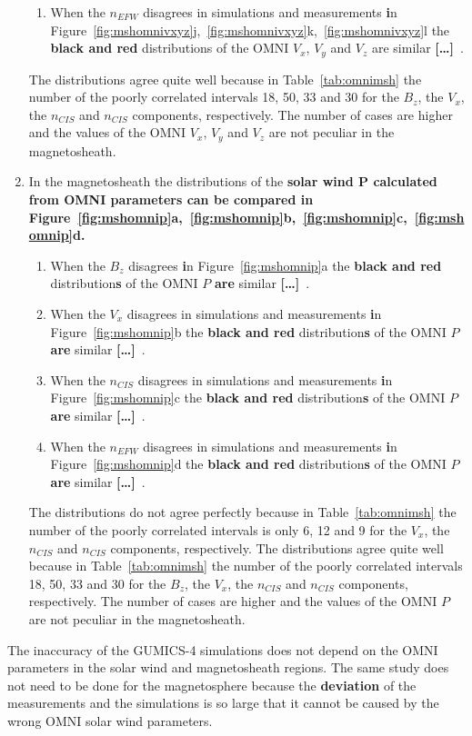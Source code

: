 \documentclass[linenumbers,draft]{agujournal}
\newcommand{\del}{\textbf{[\dots]}\ } %
\begin{document}
\begin{enumerate}
\begin{enumerate}
\item When the $n_{EFW}$ disagrees in simulations and measurements \textbf{i}n Figure~\ref{fig:mshomnivxyz}j,~\ref{fig:mshomnivxyz}k,~\ref{fig:mshomnivxyz}l the \textbf{black and red} distributions of the OMNI $V_{x}$, $V_{y}$ and $V_{z}$ are similar \del.
\end{enumerate}
The distributions agree quite well because in Table~\ref{tab:omnimsh} the number of the poorly correlated intervals 18, 50, 33 and 30 for the $B_{z}$, the $V_{x}$, the $n_{CIS}$ and $n_{CIS}$ components, respectively. The number of cases are higher and the values of the OMNI $V_{x}$, $V_{y}$ and $V_{z}$ are not peculiar in the magnetosheath.

\item In the magnetosheath the distributions of the \textbf{solar wind P calculated from OMNI parameters can be compared \textbf{i}n Figure~\ref{fig:mshomnip}a,~\ref{fig:mshomnip}b,~\ref{fig:mshomnip}c,~\ref{fig:mshomnip}d.}
\begin{enumerate}
\item When the $B_{z}$ disagrees \textbf{i}n Figure~\ref{fig:mshomnip}a the \textbf{black and red} distribution\textbf{s} of the OMNI $P$ \textbf{are} similar \del .

\item When the $V_{x}$ disagrees in simulations and measurements \textbf{i}n Figure~\ref{fig:mshomnip}b the \textbf{black and red} distribution\textbf{s} of the OMNI $P$ \textbf{are} similar \del .

\item When the $n_{CIS}$ disagrees in simulations and measurements \textbf{i}n Figure~\ref{fig:mshomnip}c the \textbf{black and red} distribution\textbf{s} of the OMNI $P$ \textbf{are} similar \del .

\item When the $n_{EFW}$ disagrees in simulations and measurements \textbf{i}n Figure~\ref{fig:mshomnip}d the \textbf{black and red} distribution\textbf{s} of the OMNI $P$ \textbf{are} similar \del .
\end{enumerate}
The distributions do not agree perfectly because in Table~\ref{tab:omnimsh} the number of the poorly correlated intervals is only 6, 12 and 9 for the $V_{x}$, the $n_{CIS}$ and $n_{CIS}$ components, respectively. The distributions agree quite well because in Table~\ref{tab:omnimsh} the number of the poorly correlated intervals 18, 50, 33 and 30 for the $B_{z}$, the $V_{x}$, the $n_{CIS}$ and $n_{CIS}$ components, respectively. The number of cases are higher and the values of the OMNI $P$ are not peculiar in the magnetosheath.
\end{enumerate}
The inaccuracy of the GUMICS-4 simulations does not depend on the OMNI parameters in the solar wind and magnetosheath regions. The same study does not need to be done for the magnetosphere because the \textbf{deviation} of the measurements and the simulations is so large that it cannot be caused by the wrong OMNI solar wind parameters.
\end{document}
